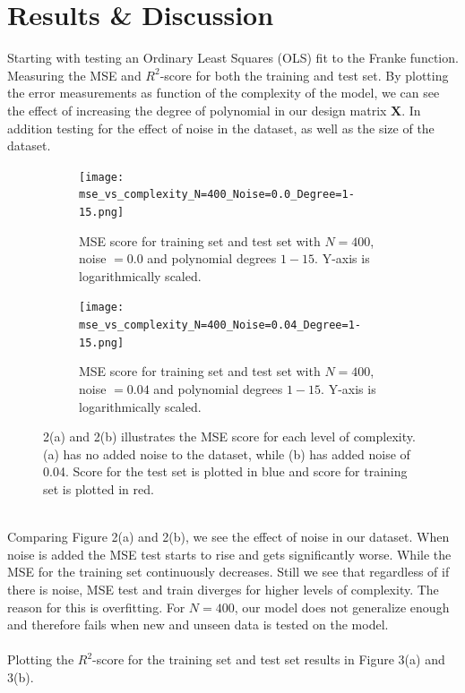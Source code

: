 \documentclass[a4paper,twocolumn]{article}
\newcommand{\X}{\mathbf{X}}
\begin{document}
\section{Results \& Discussion}
Starting with testing an Ordinary Least Squares (OLS) fit to the Franke function. Measuring the MSE and $R^{2}$-score for both the training and test set. By plotting the error measurements as function of the complexity of the model, we can see the effect of increasing the degree of polynomial in our design matrix $\X$. In addition testing for the effect of noise in the dataset, as well as the size of the dataset.
\begin{figure}[ht]
    \centering
    \begin{subfigure}[b]{0.9\columnwidth}
        \texttt{[image: mse\_vs\_complexity\_N=400\_Noise=0.0\_Degree=1-15.png]}
        \caption{MSE score for training set and test set with $N = 400$, noise $= 0.0$ and polynomial degrees $1-15$. Y-axis is logarithmically scaled.}
    \end{subfigure}
    
    \begin{subfigure}[b]{0.9\columnwidth}
        \texttt{[image: mse\_vs\_complexity\_N=400\_Noise=0.04\_Degree=1-15.png]}
        \caption{MSE score for training set and test set with $N = 400$, noise $= 0.04$ and polynomial degrees $1-15$. Y-axis is logarithmically scaled.}
    \end{subfigure}
    \caption{2(a) and 2(b) illustrates the MSE score for each level of complexity. (a) has no added noise to the dataset, while (b) has added noise of 0.04. Score for the test set is plotted in blue and score for training set is plotted in red.}
\end{figure}\\
\noindent Comparing Figure 2(a) and 2(b), we see the effect of noise in our dataset. When noise is added the MSE test starts to rise and gets significantly worse. While the MSE for the training set continuously decreases. Still we see that regardless of if there is noise, MSE test and train diverges for higher levels of complexity. The reason for this is overfitting. For $N=400$, our model does not generalize enough and therefore fails when new and unseen data is tested on the model.\\
\\
Plotting the $R^{2}$-score for the training set and test set results in Figure 3(a) and 3(b).
\end{document}
